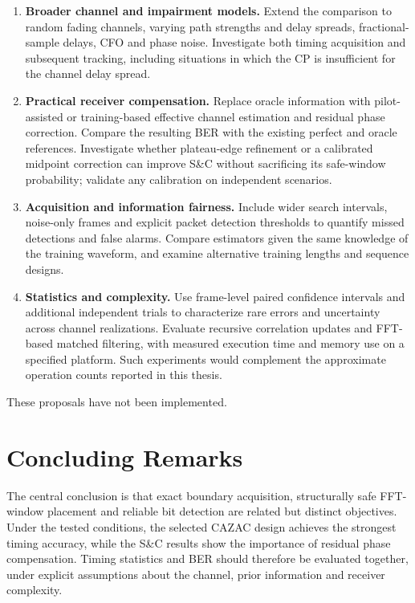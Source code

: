 \begin{enumerate}
\item \textbf{Broader channel and impairment models.}
Extend the comparison to random fading channels, varying path strengths
and delay spreads, fractional-sample delays, CFO and phase noise.
Investigate both timing acquisition and subsequent tracking, including
situations in which the CP is insufficient for the channel delay spread.

\item \textbf{Practical receiver compensation.}
Replace oracle information with pilot-assisted or training-based effective
channel estimation and residual phase correction. Compare the resulting
BER with the existing perfect and oracle references. Investigate whether
plateau-edge refinement or a calibrated midpoint correction can improve
S\&C without sacrificing its safe-window probability; validate any
calibration on independent scenarios.

\item \textbf{Acquisition and information fairness.}
Include wider search intervals, noise-only frames and explicit packet
detection thresholds to quantify missed detections and false alarms.
Compare estimators given the same knowledge of the training waveform,
and examine alternative training lengths and sequence designs.

\item \textbf{Statistics and complexity.}
Use frame-level paired confidence intervals and additional independent
trials to characterize rare errors and uncertainty across channel
realizations. Evaluate recursive correlation updates and FFT-based
matched filtering, with measured execution time and memory use on a
specified platform. Such experiments would complement the approximate
operation counts reported in this thesis.
\end{enumerate}

These proposals have not been implemented.

\section{Concluding Remarks}

The central conclusion is that exact boundary acquisition, structurally
safe FFT-window placement and reliable bit detection are related but
distinct objectives. Under the tested conditions, the selected CAZAC
design achieves the strongest timing accuracy, while the S\&C results
show the importance of residual phase compensation. Timing statistics and
BER should therefore be evaluated together, under explicit assumptions
about the channel, prior information and receiver complexity.
